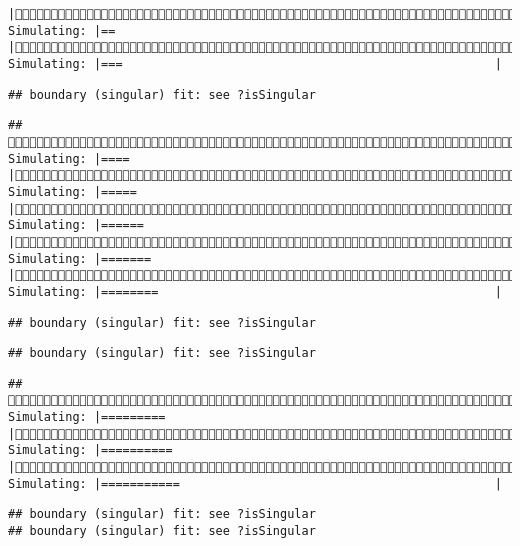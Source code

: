\documentclass[]{article}
\begin{document}
\begin{verbatim}
|(1/4) Simulating: |==                                                     |(1/4) Simulating: |===                                                    |
\end{verbatim}

\begin{verbatim}
## boundary (singular) fit: see ?isSingular
\end{verbatim}

\begin{verbatim}
## (1/4) Simulating: |====                                                   |(1/4) Simulating: |=====                                                  |(1/4) Simulating: |======                                                 |(1/4) Simulating: |=======                                                |(1/4) Simulating: |========                                               |
\end{verbatim}

\begin{verbatim}
## boundary (singular) fit: see ?isSingular
\end{verbatim}

\begin{verbatim}
## boundary (singular) fit: see ?isSingular
\end{verbatim}

\begin{verbatim}
## (1/4) Simulating: |=========                                              |(1/4) Simulating: |==========                                             |(1/4) Simulating: |===========                                            |
\end{verbatim}

\begin{verbatim}
## boundary (singular) fit: see ?isSingular
## boundary (singular) fit: see ?isSingular
\end{verbatim}
\end{document}
